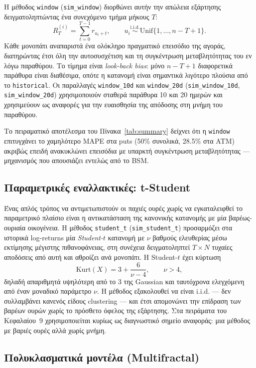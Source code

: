 \documentclass[12pt]{article}
\begin{document}
Η μέθοδος \texttt{window} (\texttt{sim\_window}) διορθώνει αυτήν την απώλεια εξάρτησης δειγματοληπτώντας ένα συνεχόμενο τμήμα μήκους $T$:
\[
  R_T^{(i)} = \sum_{t=0}^{T-1} r_{u_i + t}, \qquad u_i \stackrel{\text{i.i.d.}}{\sim} \mathrm{Unif}\{1,\dots,n-T+1\}.
\]
Κάθε μονοπάτι αναπαριστά ένα ολόκληρο πραγματικό επεισόδιο της αγοράς, διατηρώντας έτσι όλη την αυτοσυσχέτιση και τη συγκέντρωση μεταβλητότητας του εν λόγω παραθύρου. Το τίμημα είναι \emph{look-back bias}: μόνο $n-T+1$ διαφορετικά παράθυρα είναι διαθέσιμα, οπότε η κατανομή είναι σημαντικά λιγότερο πλούσια από το \texttt{historical}. Οι παραλλαγές \texttt{window\_10d} και \texttt{window\_20d} (\texttt{sim\_window\_10d}, \texttt{sim\_window\_20d}) χρησιμοποιούν σταθερά παράθυρα 10 και 20 ημερών και χρησιμεύουν ως αναφορές για την ευαισθησία της απόδοσης στη μνήμη του παραθύρου.

Το πειραματικό αποτέλεσμα του Πίνακα~\ref{tab:summary} δείχνει ότι η \texttt{window} επιτυγχάνει το χαμηλότερο MAPE στα puts (50\% συνολικά, 28.5\% στα ATM) ακριβώς επειδή ανακυκλώνει επεισόδια με υπαρκτή συγκέντρωση μεταβλητότητας — μηχανισμός που απουσιάζει εντελώς από το BSM.

\subsection{Παραμετρικές εναλλακτικές: t-Student}
Ένας απλός τρόπος να αντιμετωπιστούν οι παχιές ουρές χωρίς να εγκαταλειφθεί το παραμετρικό πλαίσιο είναι η αντικατάσταση της κανονικής κατανομής με μία βαρέως-ουριαία οικογένεια. Η μέθοδος \texttt{student\_t} (\texttt{sim\_student\_t}) προσαρμόζει στα ιστορικά log-returns μία \emph{Student-$t$} κατανομή με $\nu$ βαθμούς ελευθερίας μέσω εκτίμησης μέγιστης πιθανοφάνειας, στη συνέχεια δειγματοληπτεί $T \times N$ τυχαίες αποδόσεις από αυτή και αθροίζει ανά μονοπάτι. Η Student-$t$ έχει κύρτωση
\[
  \mathrm{Kurt}(X) = 3 + \frac{6}{\nu - 4}, \qquad \nu > 4,
\]
δηλαδή απαριθμητά υψηλότερη από το 3 της Gaussian και ταυτόχρονα ελεγχόμενη από έναν μοναδικό παράμετρο $\nu$. Η μέθοδος εξακολουθεί να είναι i.i.d. — δεν συλλαμβάνει κανενός είδους clustering — και έτσι απομονώνει την επίδραση των βαρέων ουρών χωρίς το πρόσθετο όφελος της εξάρτησης. Στα πειράματα του Κεφαλαίου~9 χρησιμοποιείται κυρίως ως διαγνωστικό σημείο αναφοράς: μια μέθοδος με βαριές ουρές αλλά χωρίς μνήμη.

\subsection{Πολυκλασματικά μοντέλα (Multifractal)}
\label{sec:mmar}
\end{document}
